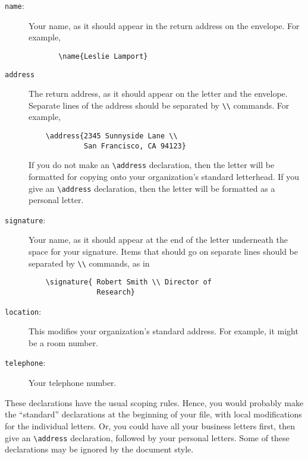 \begin{description}
\item[{\tt \bs name}:] Your name, as it should appear in the
   return address on the envelope.  For example,
\begin{verbatim}
       \name{Leslie Lamport}
\end{verbatim}


\item[{\tt \bs address}] The return address, as it should appear
    on the letter and the envelope.  Separate lines of the address
    should be separated by \verb"\\" commands.  For example,
\begin{verbatim}
    \address{2345 Sunnyside Lane \\
             San Francisco, CA 94123}
\end{verbatim}
    If you do not make an
    \hbox{\verb"\address"} declaration, then the letter will
    be formatted for copying onto your organization's standard
    letterhead.  If you give an \hbox{\verb"\address"} declaration,
    then the letter will be formatted as a personal letter.

\item[{\tt \bs signature}:] Your name, as it should appear at the
   end of the letter underneath the space for your signature.
   Items that should go on separate lines should be separated
   by \verb"\\" commands, as in
\begin{verbatim}
    \signature{ Robert Smith \\ Director of 
                Research}
\end{verbatim}


\item[{\tt \bs location}:] This modifies your organization's standard
    address.  For example, it might be a room number.

\item[{\tt \bs telephone}:]  Your telephone number.
\end{description}

These declarations have the usual scoping rules.  Hence, you would
probably make the ``standard'' declarations at the beginning of your
file, with local modifications for the individual letters.  Or, you
could have all your business letters first, then give an
\hbox{\verb"\address"} declaration, followed by your personal letters.
Some of these declarations may be ignored by the document style.


